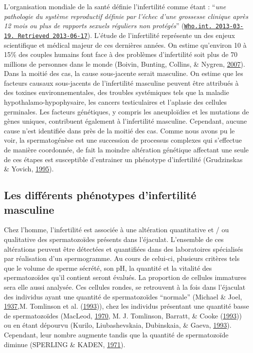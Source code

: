 \documentclass[12pt,twoside]{reedthesis}
\theoremstyle{definition}
\theoremstyle{definition}
\theoremstyle{remark}
\begin{document}
  L'organisation mondiale de la santé définie l'infertilité comme étant :
  ``\emph{une pathologie du système reproductif définie par l'échec d'une
  grossesse clinique après 12 mois ou plus de rapports sexuels réguliers
  non protégés}''
  (\href{http://www.who.int/reproductivehealth/topics/infertility/definitions/en/}{\texttt{Who.int.\ 2013-03-19.\ Retrieved\ 2013-06-17}}).
  L'étude de l'infertilité représente un des enjeux scientifique et
  médical majeur de ces dernières années. On estime qu'environ 10 à 15\%
  des couples humains font face à des problèmes d'infertilité soit plus de
  70 millions de personnes dans le monde (Boivin, Bunting, Collins, \&
  Nygren, \protect\hyperlink{ref-Boivin2007a}{2007}). Dans la moitié des
  cas, la cause sous-jacente serait masculine. On estime que les facteurs
  causaux sous-jacents de l'infertilité masculine peuvent être attribués à
  des toxines environnementales, des troubles systémiques tels que la
  maladie hypothalamo-hypophysaire, les cancers testiculaires et l'aplasie
  des cellules germinales. Les facteurs génétiques, y compris les
  aneuploïdies et les mutations de gènes uniques, contribuent également à
  l'infertilité masculine. Cependant, aucune cause n'est identifiée dans
  près de la moitié des cas. Comme nous avons pu le voir, la
  spermatogénèse est une succession de processus complexes qui s'effectue
  de manière coordonnée, de fait la moindre altération génétique affectant
  une seule de ces étapes est susceptible d'entrainer un phénotype
  d'infertilité (Grudzinskas \& Yovich,
  \protect\hyperlink{ref-Grudzinskas1995}{1995}).
  
  \subsection{Les différents phénotypes d'infertilité
  masculine}\label{les-differents-phenotypes-dinfertilite-masculine}
  
  Chez l'homme, l'infertilité est associée à une altération quantitative
  et / ou qualitative des spermatozoïdes présents dans l'éjaculat.
  L'ensemble de ces altérations peuvent être détectées et quantifiées dans
  des laboratoires spécialisés par réalisation d'un spermogramme. Au cours
  de celui-ci, plusieurs critères tels que le volume de sperme sécrété,
  son pH, la quantité et la vitalité des spermatozoïdes qu'il contient
  seront évalués. La proportion de cellules immatures sera elle aussi
  analysée. Ces cellules rondes, se retrouvent à la fois dans l'éjaculat
  des individus ayant une quantité de spermatozoïdes ``normale'' (Michael
  \& Joel, \protect\hyperlink{ref-Michael1937}{1937},M. Tomlinson et al.
  (\protect\hyperlink{ref-Tomlinson1993a}{1993})), chez les individus
  présentant une quantité basse de spermatozoïdes (MacLeod,
  \protect\hyperlink{ref-MacLeod1970}{1970}, M. J. Tomlinson, Barratt, \&
  Cooke (\protect\hyperlink{ref-Tomlinson1993}{1993})) ou en étant
  dépourvu (Kurilo, Liubashevskaia, Dubinskaia, \& Gaeva,
  \protect\hyperlink{ref-Kurilo}{1993}). Cependant, leur nombre augmente
  tandis que la quantité de spermatozoïde diminue (SPERLING \& KADEN,
  \protect\hyperlink{ref-SPERLING1971}{1971}).
  
\end{document}
